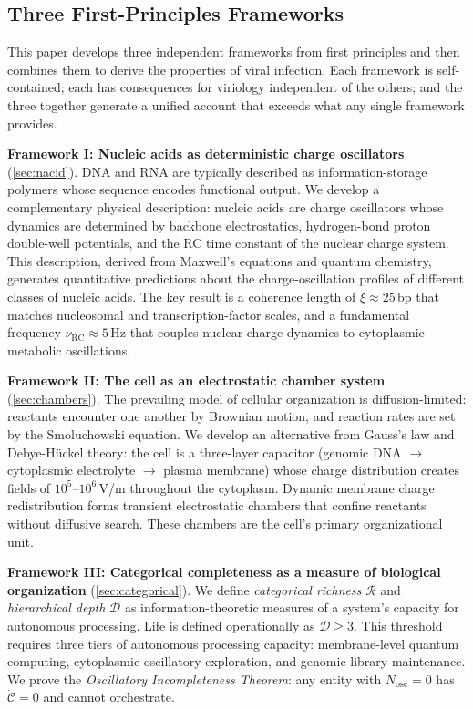 \documentclass[12pt,a4paper]{article}
\theoremstyle{definition}
\theoremstyle{remark}
\newcommand{\nuRC}{\nu_{\mathrm{RC}}}
\newcommand{\Nosc}{N_{\mathrm{osc}}}
\newcommand{\Rcat}{\mathcal{R}}
\newcommand{\Dcat}{\mathcal{D}}
\begin{document}
\subsection{Three First-Principles Frameworks}

This paper develops three independent frameworks from first principles and then combines them to derive the properties of viral infection. Each framework is self-contained; each has consequences for viriology independent of the others; and the three together generate a unified account that exceeds what any single framework provides.

\textbf{Framework I: Nucleic acids as deterministic charge oscillators} (\cref{sec:nacid}). DNA and RNA are typically described as information-storage polymers whose sequence encodes functional output. We develop a complementary physical description: nucleic acids are charge oscillators whose dynamics are determined by backbone electrostatics, hydrogen-bond proton double-well potentials, and the RC time constant of the nuclear charge system. This description, derived from Maxwell's equations and quantum chemistry, generates quantitative predictions about the charge-oscillation profiles of different classes of nucleic acids. The key result is a coherence length of $\xi \approx 25$\,bp that matches nucleosomal and transcription-factor scales, and a fundamental frequency $\nuRC \approx 5$\,Hz that couples nuclear charge dynamics to cytoplasmic metabolic oscillations.

\textbf{Framework II: The cell as an electrostatic chamber system} (\cref{sec:chambers}). The prevailing model of cellular organization is diffusion-limited: reactants encounter one another by Brownian motion, and reaction rates are set by the Smoluchowski equation. We develop an alternative from Gauss's law and Debye-H\"{u}ckel theory: the cell is a three-layer capacitor (genomic DNA $\to$ cytoplasmic electrolyte $\to$ plasma membrane) whose charge distribution creates fields of $10^5$--$10^6$\,V/m throughout the cytoplasm. Dynamic membrane charge redistribution forms transient electrostatic chambers that confine reactants without diffusive search. These chambers are the cell's primary organizational unit.

\textbf{Framework III: Categorical completeness as a measure of biological organization} (\cref{sec:categorical}). We define \emph{categorical richness} $\Rcat$ and \emph{hierarchical depth} $\Dcat$ as information-theoretic measures of a system's capacity for autonomous processing. Life is defined operationally as $\Dcat \geq 3$. This threshold requires three tiers of autonomous processing capacity: membrane-level quantum computing, cytoplasmic oscillatory exploration, and genomic library maintenance. We prove the \emph{Oscillatory Incompleteness Theorem}: any entity with $\Nosc = 0$ has $\dot{\mathcal{C}} = 0$ and cannot orchestrate.
\end{document}

